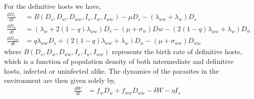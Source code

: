\documentclass[11pt]{article}
\begin{document}
For the definitive hosts we have,
\begin{align}
\frac{dD_s}{dt} &= B(D_s,  D_w,  D_{ww},  I_s, I_w, I_{ww})  - \mu D_s - (\lambda_{ww} + \lambda_w) D_s \nonumber \\    
\frac{dD_w}{dt} &= (\lambda_w + 2 (1 - q) \lambda_{ww}) D_s - (\mu + \sigma_w) Dw - (2 (1 - q) \lambda_{ww} + \lambda_w) D_w  \label{odes:dhosts} \\         
\frac{dD_{ww}}{dt} &= q \lambda_{ww} D_s + (2 (1 - q) \lambda_{ww} + \lambda_w) D_w - (\mu + \sigma_{ww}) D_{ww} \nonumber
\end{align}
%
where $B(D_s, D_w, D_{ww}, I_s, I_w, I_{ww})$ represents the birth rate of definitive hosts, which is a function of population density of both intermediate and definitive hosts, infected or uninfected alike. 
The dynamics of the parasites in the environment are then given solely by,
\begin{align}
	\frac{dW}{dt} &= f_w D_w + f_{ww} D_{ww} - \delta W - \eta I_s \label{odes:eparasite}
\end{align}
\end{document}

